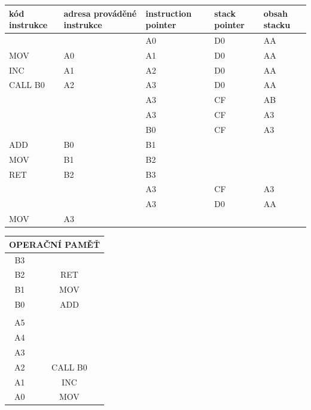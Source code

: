 \documentclass[a4paper,12pt]{article}
\begin{document}
\begin{minipage}[b]{0.75\textwidth}
    \begin{tabular}{|P{2cm}|P{2cm}|P{2cm}|P{2cm}|P{2cm}|}
        \hline
        kód instrukce & adresa prováděné instrukce & instruction pointer & stack pointer & obsah stacku \\ \hline
        & & A0 & D0 & AA \\ \hline
        MOV & A0 & A1 & D0 & AA \\
        INC & A1 & A2 & D0 & AA \\ \hline
        CALL B0 & A2 & A3 & D0 & AA \\
        & & A3 & CF & AB \\
        & & A3 & CF & A3 \\
        & & B0 & CF & A3 \\ \hline
        ADD & B0 & B1 & & \\
        MOV & B1 & B2 & & \\
        RET & B2 & B3 & & \\
        & & A3 & CF & A3 \\
        & & A3 & D0 & AA \\ \hline
        MOV & A3 & & & \\ \hline
    \end{tabular}
\end{minipage}%
\begin{minipage}[b]{0.25\textwidth}
    \begin{tabular}{|c|c|}
        \hline
        \multicolumn{2}{|P{3cm}|}{OPERAČNÍ PAMĚŤ} \\ \hline
        B3 & \\ \hline
        B2 & RET \\ \hline
        B1 & MOV \\ \hline
        B0 & ADD \\ \hline
        \multicolumn{2}{|l|}{} \\ \hline
        A5 & \\ \hline
        A4 & \\ \hline
        A3 & \\ \hline
        A2 & CALL B0 \\ \hline
        A1 & INC \\ \hline
        A0 & MOV \\ \hline
    \end{tabular}
\end{minipage}

\vspace{5mm}
\end{document}
